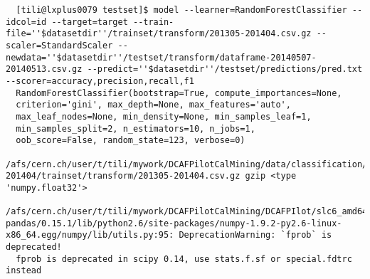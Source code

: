 
\begin{verbatim}
  [tili@lxplus0079 testset]$ model --learner=RandomForestClassifier --idcol=id --target=target --train-file=''$datasetdir''/trainset/transform/201305-201404.csv.gz --scaler=StandardScaler --newdata=''$datasetdir''/testset/transform/dataframe-20140507-20140513.csv.gz --predict=''$datasetdir''/testset/predictions/pred.txt --scorer=accuracy,precision,recall,f1
  RandomForestClassifier(bootstrap=True, compute_importances=None,
  criterion='gini', max_depth=None, max_features='auto',
  max_leaf_nodes=None, min_density=None, min_samples_leaf=1,
  min_samples_split=2, n_estimators=10, n_jobs=1,
  oob_score=False, random_state=123, verbose=0)
  /afs/cern.ch/user/t/tili/mywork/DCAFPilotCalMining/data/classification/tier2/merge_conf_tier2_201305-201404/trainset/transform/201305-201404.csv.gz gzip <type 'numpy.float32'>
  /afs/cern.ch/user/t/tili/mywork/DCAFPilotCalMining/DCAFPIlot/slc6_amd64_gcc481/external/py2-pandas/0.15.1/lib/python2.6/site-packages/numpy-1.9.2-py2.6-linux-x86_64.egg/numpy/lib/utils.py:95: DeprecationWarning: `fprob` is deprecated!
  fprob is deprecated in scipy 0.14, use stats.f.sf or special.fdtrc instead


\end{verbatim}

